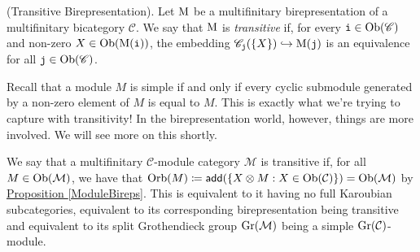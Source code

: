 \noindent\begin{definition}\textnormal{(Transitive Birepresentation).} Let $\textnormal{M}$ be a multifinitary birepresentation of a multifinitary bicategory $\mathscr{C}$. We say that $\textnormal{M}$ is {\em transitive} if, %
for every $\textnormal{\texttt{i}} \in \textnormal{Ob}(\mathscr{C})$ and non-zero $X \in \textnormal{Ob}(\textnormal{M}(\textnormal{\texttt{i}}))$, the embedding $\mathscr{C}_{\textnormal{\texttt{j}}}(\{X\}) \hookrightarrow \textnormal{M}(\textnormal{\texttt{j}})$ is an equivalence for all $\textnormal{\texttt{j}} \in \textnormal{Ob}(\mathscr{C})$.\\
\end{definition}
\newpage

\noindent\begin{remark} Recall that a module $M$ is simple if and only if every cyclic submodule generated by a non-zero element of $M$ is equal to $M$. This is exactly what we're trying to capture with transitivity! In the birepresentation world, however, things are more involved. We will see more on this shortly.\\%
\end{remark}

\noindent We say that a multifinitary $\mathcal{C}$-module category $\mathcal{M}$ is transitive if, for all $M \in \textnormal{Ob}(\mathcal{M})$, we have that $\textnormal{Orb}(M) \coloneqq \textsf{add}(\{X \otimes M : X \in \textnormal{Ob}(\mathcal{C})\}) = \textnormal{Ob}(\mathcal{M})$ by \hyperref[ModuleBireps]{Proposition \ref*{ModuleBireps}}. This is equivalent to it having no full Karoubian subcategories, equivalent to its corresponding birepresentation being transitive and equivalent to its split Grothendieck group $\textnormal{Gr}(\mathcal{M})$ being a simple $\textnormal{Gr}(\mathcal{C})$-module.\\


